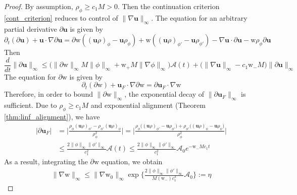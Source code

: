 \documentclass[11pt,letterpaper]{amsart}
\theoremstyle{plain}
\theoremstyle{definition}
\theoremstyle{remark}
\def \cA {\mathcal{A}}
\renewcommand{\geq}{\geqslant}
\renewcommand{\leq}{\leqslant}
\def\u{\textbf{u}}
\def \wt {\mathrm{w}}
\begin{document}
\begin{proof}
    By assumption, $\rho_{\phi} \geq c_1 M > 0$. Then the continuation criterion \eqref{cont_criterion} 
    reduces to control of $\|\nabla \u\|_{\infty}$. 
    The equation for an arbitrary partial derivative $\partial \u$ is given by 
    \begin{equation}
        \label{eqn:partial_u}
        \partial_t (\partial \u) + \u \cdot \nabla \partial \u = 
            \partial \wt ( (\u\rho)_{\phi} - \u \rho_{\phi} )
            + \wt ( (\u\rho)_{\phi'} - \u \rho_{\phi'} )
            - \nabla \u \cdot \partial \u - \wt \rho_{\phi} \partial \u
    \end{equation}
    Then 
    \begin{equation*}
        \frac{d}{dt} \|\partial \u\|_{\infty} 
            \leq \big( \| \partial \wt \|_{\infty} M \|\phi\|_{\infty} + \wt_+ M \|\nabla \phi\|_{\infty} \big) \cA(t) 
            + \big( \|\nabla \u\|_{\infty} - c_1 \wt_- M  \big) \|\partial \u \|_{\infty}
    \end{equation*}
    The equation for $\partial \wt$ is given by
    \begin{equation*}
        \partial_t (\partial \wt) + \u_F \cdot \nabla \partial \wt = \partial \u_F \cdot \nabla \wt 
    \end{equation*}
    Therefore, in order to bound $\|\partial \wt\|_{\infty}$, the exponential decay of $\|\partial \u_F\|_{\infty}$ is sufficient.
    Due to $\rho_{\phi} \geq c_1 M$ and exponential alignment (Theorem \ref{thm:linf_alignment}), we have 
    \begin{align}
        \label{ineq:decay_u_F}
        |\partial \u_F|
            &= \Big| \frac{\rho_{\phi} (\u \rho)_{\phi'} - \rho_{\phi'} (\u\rho)_{\phi} }{\rho_{\phi}^2} \Big|
            = \Big| \frac{\rho_{\phi} \big( (\u \rho)_{\phi'} - \u \rho_{\phi'} \big) 
                + \rho_{\phi'} \big( (\u\rho)_{\phi} - \u \rho_{\phi} \big) }{\rho_{\phi}^2} \Big| \\
            &\leq \frac{2 \|\phi\|_{\infty} \|\phi'\|_{\infty}}{c_1^2} \cA(t) \leq \frac{2 \|\phi\|_{\infty} \|\phi'\|_{\infty}}{c_1^2} \cA_0 e^{-\wt_- Mc_1t} \nonumber
    \end{align}
    As a result, integrating the $\partial \wt$ equation, we obtain
    \begin{align}
        \label{eqn:bd_on_w_x}
        \|\nabla \wt\|_{\infty} \leq \|\nabla \wt_0\|_{\infty} \exp \Big\{ \frac{2 \|\phi\|_{\infty} \|\phi'\|_{\infty}}{M (\wt_-) c_1^3} \cA_0 \Big\} := \eta 
    \end{align}

\end{proof}
\end{document}
